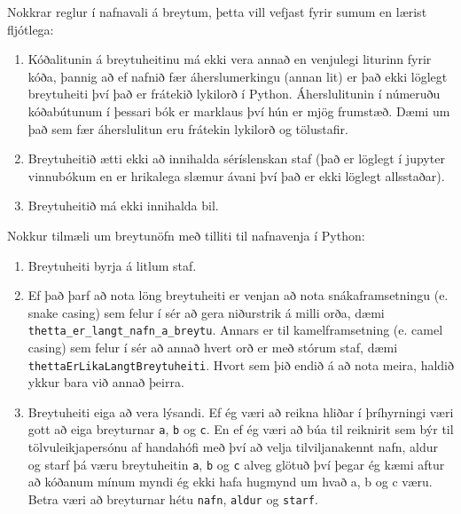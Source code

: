 Nokkrar reglur í nafnavali á breytum, þetta vill vefjast fyrir sumum en lærist fljótlega:
\vspace{0.5cm}
\begin{enumerate}
	\item Kóðalitunin á breytuheitinu má ekki vera annað en venjulegi liturinn fyrir kóða, þannig að ef nafnið fær áherslumerkingu (annan lit) er það ekki löglegt breytuheiti því það er frátekið lykilorð í Python. 
	Áherslulitunin í númeruðu kóðabútunum í þessari bók er marklaus því hún er mjög frumstæð.
	Dæmi um það sem fær áherslulitun eru frátekin lykilorð og tölustafir.
	\item Breytuheitið ætti ekki að innihalda séríslenskan staf (það er löglegt í jupyter vinnubókum en er hrikalega slæmur ávani því það er ekki löglegt allsstaðar).
	\item Breytuheitið má ekki innihalda bil.
\end{enumerate}
\vspace{0.5cm}
Nokkur tilmæli um breytunöfn með tilliti til nafnavenja í Python:
\vspace{0.5cm}
\begin{enumerate}
	\item Breytuheiti byrja á litlum staf.
	\item Ef það þarf að nota löng breytuheiti er venjan að nota snákaframsetningu (e. snake casing) sem felur í sér að gera niðurstrik á milli orða, dæmi \texttt{thetta\_er\_langt\_nafn\_a\_breytu}.
	Annars er til kamelframsetning (e. camel casing) sem felur í sér að annað hvert orð er með stórum staf, dæmi \texttt{thettaErLikaLangtBreytuheiti}.
	Hvort sem þið endið á að nota meira, haldið ykkur bara við annað þeirra.
	\item Breytuheiti eiga að vera lýsandi.
	Ef ég væri að reikna hliðar í þríhyrningi væri gott að eiga breyturnar \texttt{a}, \texttt{b} og \texttt{c}.
	En ef ég væri að búa til reiknirit sem býr til tölvuleikjapersónu af handahófi með því að velja tilviljanakennt nafn, aldur og starf þá væru breytuheitin \texttt{a}, \texttt{b} og \texttt{c} alveg glötuð því þegar ég kæmi aftur að kóðanum mínum myndi ég ekki hafa hugmynd um hvað a, b og c væru. 
	Betra væri að breyturnar hétu \texttt{nafn}, \texttt{aldur} og \texttt{starf}.
\end{enumerate}

